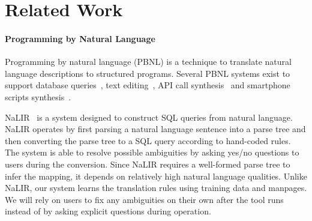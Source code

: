 \section{Related Work}


\paragraph{Programming by Natural Language} Programming by natural language (PBNL) is a technique to translate natural language descriptions to structured programs. Several PBNL systems exist to support database queries~\cite{DBLP:conf/sigmod/GulwaniM14, DBLP:journals/tods/LiYJ07, DBLP:journals/pvldb/LiJ14}, text editing~\cite{DBLP:journals/corr/DesaiGHJKMRR15}, API call synthesis~\cite{DBLP:journals/corr/RaghothamanWH15} and smartphone scripts synthesis~\cite{DBLP:conf/mobisys/LeGS13}.

NaLIR~\cite{DBLP:journals/pvldb/LiJ14} is a system designed to construct SQL queries from natural language. NaLIR operates by first parsing a natural language sentence into a parse tree and then converting the parse tree to a SQL query according to hand-coded rules. The system is able to resolve possible ambiguities by asking yes/no questions to users during the conversion. Since NaLIR requires a well-formed parse tree to infer the mapping, it depends on relatively high natural language qualities. Unlike NaLIR, our system learns the translation rules using training data and manpages. We will rely on users to fix any ambiguities on their own after the tool runs instead of by asking explicit questions during operation.


